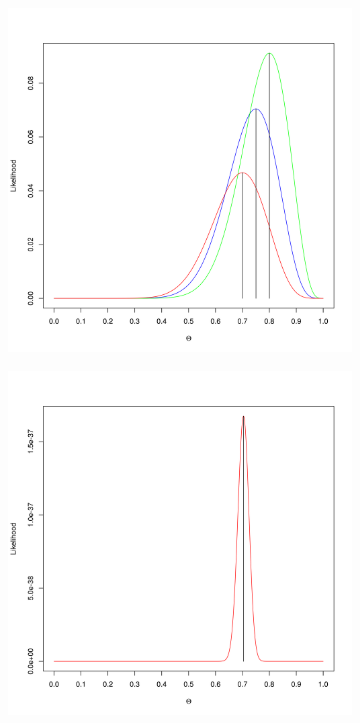 \begin{figure}
\center
\begin{subfigure}{\textwidth}
\center
\includegraphics[scale=.4]{sparse_likelihood.png}
\caption{}
\label{fig:sparse_likelihood}
\end{subfigure}
\begin{subfigure}{\textwidth}
\center
\includegraphics[scale=.4]{dense_likelihood.png}

\end{subfigure}
\end{figure}
